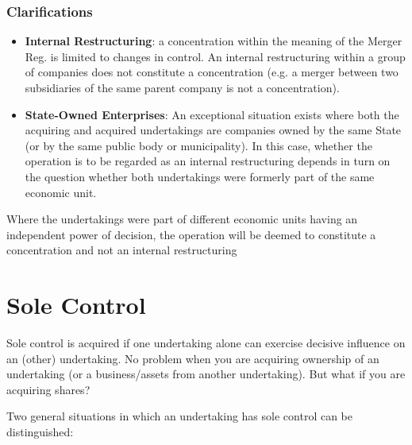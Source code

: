         \subsubsection{Clarifications}


            \begin{itemize}
                \item \textbf{Internal Restructuring}: a concentration within the meaning of the Merger Reg. is limited to changes in control. An internal restructuring within a group of companies does not constitute a concentration (e.g. a merger between two subsidiaries of the same parent company is not a concentration).
                \item \textbf{State-Owned Enterprises}: An exceptional situation exists where both the acquiring and acquired undertakings are companies owned by the same State (or by the same public body or municipality). In this case, whether the operation is to be regarded as an internal restructuring depends in turn on the question whether both undertakings were formerly part of the same economic unit. 
            \end{itemize}

            Where the undertakings were part of different economic units having an independent power of decision, the operation will be deemed to constitute a concentration and not an internal restructuring

\section{Sole Control}

    Sole control is acquired if one undertaking alone can exercise decisive influence on an (other) undertaking. No problem when you are acquiring ownership of an undertaking (or a business/assets from another undertaking). But what if you are acquiring shares?

    \noindent
    Two general situations in which an undertaking has sole control can be distinguished:

